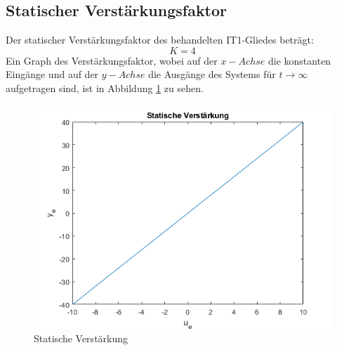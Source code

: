 
\subsection{Statischer Verstärkungsfaktor}

Der statischer Verstärkungsfaktor des behandelten IT1-Gliedes beträgt: \[K=4\]
Ein Graph des Verstärkungsfaktor, wobei auf der $x-Achse$ die konstanten Eingänge und auf der $y-Achse$ die Ausgänge des Systems für $t \rightarrow \infty$ aufgetragen sind, ist in Abbildung \ref{fig:static-curve} zu sehen.

\begin{figure}[H]
	\centering
	\includegraphics[width=0.7\linewidth]{"diagrams/static curve"}
	\caption[Statische Verstärkung]{Statische Verstärkung}
	\label{fig:static-curve}
\end{figure}